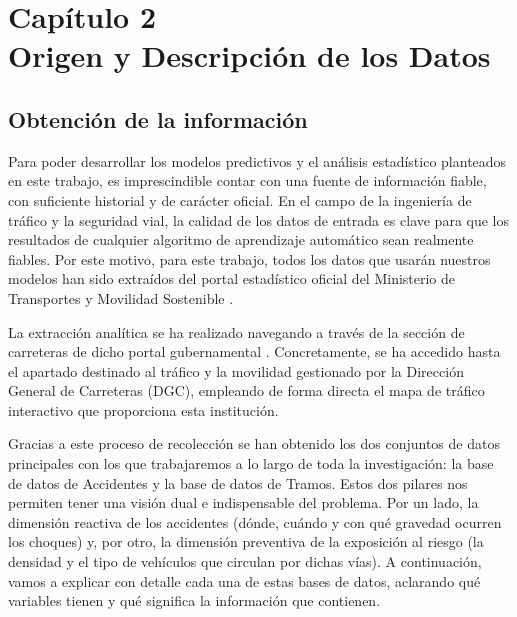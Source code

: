 \documentclass[twoside,a4paper,12pt,onecolumn,openany]{book}
\begin{document}

\setcounter{chapter}{2}
\chapter*{Capítulo 2 \\ \vspace{1cm} Origen y Descripción de los Datos}

\setcounter{section}{0}
\setcounter{figure}{0}\setcounter{table}{0}

\section{Obtención de la información}

Para poder desarrollar los modelos predictivos y el análisis estadístico planteados en este trabajo, es imprescindible contar con una fuente de información fiable, con suficiente historial y de carácter oficial. En el campo de la ingeniería de tráfico y la seguridad vial, la calidad de los datos de entrada es clave para que los resultados de cualquier algoritmo de aprendizaje automático sean realmente fiables. Por este motivo, para este trabajo, todos los datos que usarán nuestros modelos han sido extraídos del portal estadístico oficial del Ministerio de Transportes y Movilidad Sostenible \cite{mapatraficodgc}.

\vspace{0.5cm}

La extracción analítica se ha realizado navegando a través de la sección de carreteras de dicho portal gubernamental \cite{mapatraficodgc}. Concretamente, se ha accedido hasta el apartado destinado al tráfico y la movilidad gestionado por la Dirección General de Carreteras (DGC), empleando de forma directa el mapa de tráfico interactivo que proporciona esta institución. 

\vspace{0.5cm}

Gracias a este proceso de recolección se han obtenido los dos conjuntos de datos principales con los que trabajaremos a lo largo de toda la investigación: la base de datos de Accidentes y la base de datos de Tramos. Estos dos pilares nos permiten tener una visión dual e indispensable del problema. Por un lado, la dimensión reactiva de los accidentes (dónde, cuándo y con qué gravedad ocurren los choques) y, por otro, la dimensión preventiva de la exposición al riesgo (la densidad y el tipo de vehículos que circulan por dichas vías). A continuación, vamos a explicar con detalle cada una de estas bases de datos, aclarando qué variables tienen y qué significa la información que contienen.
\end{document}
